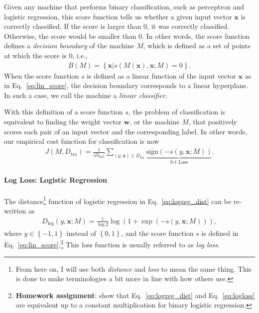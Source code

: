 \documentclass{report}
\newcommand{\vect}[1]{\mathbf{#1}}
\newcommand{\vx}[0]{\vect{x}}
\newcommand{\vw}[0]{\vect{w}}
\newcommand{\sign}{\text{sign}}
\begin{document}
Given any machine that performs binary classification, such as perceptron and
logistic regression, this score function tells us whether a given input vector
$\vx$ is correctly classified. If the score is larger than 0, it was correctly
classified. Otherwise, the score would be smaller than 0. In other words, the
score function defines a {\it decision boundary} of the machine $M$, which is
defined as a set of points at which the score is $0$, i.e.,
\begin{align*}
    B(M) = \left\{ \vx | s(M(\vx), \vx; M) = 0 \right\}.
\end{align*}
When the score function $s$ is defined as a linear function of the input vector
$\vx$ as in Eq.~\eqref{eq:lin_score}, the decision boundary corresponds to a
linear hyperplane. In such a case, we call the machine a {\it linear
classifier}. 

With this definition of a score function $s$, the problem of classification is
equivalent to finding the weight vector $\vw$, or the machine $M$, that
positively scores each pair of an input vector and the corresponding label. In
other words, our empirical cost function for classification is now 
\begin{align}
    \label{eq:0-1_loss}
    J(M, D_{\text{tra}}) = \frac{1}{|D_{\text{tra}}|} \sum_{(y, \vx) \in D_{\text{tra}}} 
    \underbrace{\overline{\sign}(-s(y, \vx; M))}_{
        \text{0-1 Loss}
    }.
\end{align}

\paragraph{Log Loss: Logistic Regression}

The distance\footnote{
    From here on, I will use both {\it distance} and {\it loss} to mean the same
    thing. This is done to make terminologies a bit more in line with how
    others use.
}
function of logistic regression in Eq.~\eqref{eq:logreg_dist} can be re-written
as
\begin{align}
    \label{eq:logloss}
    D_{\log}(y, \vx; M) = \frac{1}{\log 2} \log(1+\exp(-s(y, \vx; M))),
\end{align}
where $y \in \left\{ -1, 1\right\}$ instead of $\left\{ 0, 1 \right\}$, and the
score function $s$ is defined in Eq.~\eqref{eq:lin_score}.\footnote{
    {\bf Homework assignment}: show that Eq.~\eqref{eq:logreg_dist} and
    Eq.~\eqref{eq:logloss} are equivalent up to a constant multiplication for
    binary logistic regression.
} This loss function is usually referred to as {\it log loss}.
\end{document}
